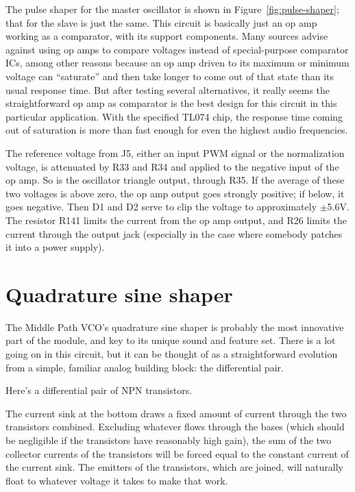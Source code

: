 The pulse shaper for the master oscillator is shown in
Figure~\ref{fig:pulse-shaper}; that for the slave is just the same.  This
circuit is basically just an op amp working as a comparator, with its
support components.  Many sources advise against using op amps to compare
voltages instead of special-purpose comparator ICs, among other reasons
because an op amp driven to its maximum or minimum voltage can ``saturate''
and then take longer to come out of that state than its usual response time. 
But after testing several alternatives, it really seems the straightforward
op amp as comparator is the best design for this circuit in this particular
application.  With the specified TL074 chip, the response time coming out of
saturation is more than fast enough for even the highest audio frequencies.

The reference voltage from J5, either an input PWM signal or the
normalization voltage, is attenuated by R33 and R34 and applied to the
negative input of the op amp.  So is the oscillator triangle output, through
R35.  If the average of these two voltages is above zero, the op amp output
goes strongly positive; if below, it goes negative.  Then D1 and D2 serve to
clip the voltage to approximately $\pm$5.6V.  The resistor R141 limits the
current from the op amp output, and R26 limits the current through the
output jack (especially in the case where somebody patches it into a power
supply).


\section{Quadrature sine shaper}

The Middle Path VCO's quadrature sine shaper is probably the most innovative
part of the module, and key to its unique sound and feature set.  There is a
lot going on in this circuit, but it can be thought of as a straightforward
evolution from a simple, familiar analog building block:  the differential
pair.

Here's a differential pair of NPN transistors.

{\centering\par}

The current sink at the bottom draws a fixed amount of current through the
two transistors combined.  Excluding whatever flows through the bases (which
should be negligible if the transistors have reasonably high gain), the sum
of the two collector currents of the transistors will be forced equal to the
constant current of the current sink.  The emitters of the transistors,
which are joined, will naturally float to whatever voltage it takes to make
that work.

